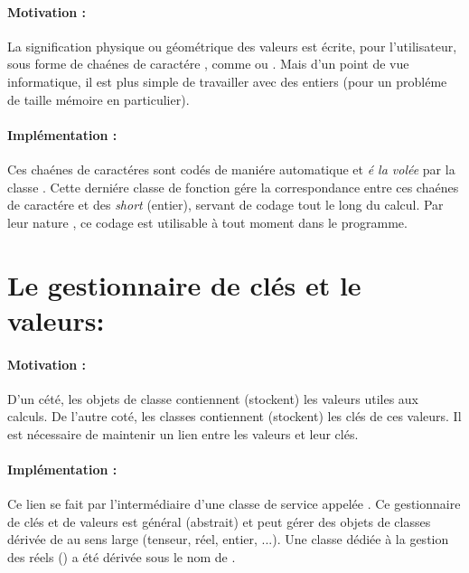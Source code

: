 \paragraph*{Motivation :}

La signification physique ou g\'eom\'etrique des valeurs est \'ecrite,
pour l'utilisateur, sous forme de cha\'enes de caract\'ere  , comme  ou
. Mais d'un point de vue informatique, il est plus
simple de travailler avec des entiers (pour un probl\'eme de taille
m\'emoire en particulier).

\paragraph*{Impl\'ementation :}
Ces cha\'enes de caract\'eres sont  cod\'es de mani\'ere automatique et
\textit{\'e la vol\'ee} par la classe . Cette derni\'ere
classe de fonction  g\'ere la
correspondance entre ces cha\'enes de caract\'ere et des  \textit{short}
(entier), servant de codage tout le long du calcul. Par leur nature
, ce codage est utilisable \`a tout moment dans le
programme.



\section{Le gestionnaire de cl\'es et le valeurs: }\label{xValManager}

\paragraph*{Motivation :}
D'un c\'et\'e, les objets de classe  contiennent (stockent)
les valeurs utiles aux calculs. De l'autre cot\'e, les classes
 contiennent (stockent) les cl\'es de ces valeurs. Il
est n\'ecessaire de maintenir un lien entre les valeurs et leur cl\'es.


\paragraph*{Impl\'ementation :}
Ce lien se fait par l'interm\'ediaire d'une  classe de service appel\'ee
. Ce gestionnaire de cl\'es et
de valeurs est g\'en\'eral (abstrait) et peut g\'erer des objets de
classes d\'eriv\'ee de   au sens large (tenseur, r\'eel,
entier, ...). Une classe d\'edi\'ee \`a la gestion des r\'eels
() a \'et\'e d\'eriv\'ee sous le nom de
.

